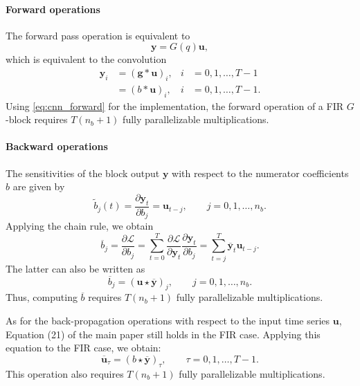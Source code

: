 \documentclass{article}
\newcommand{\q}{q} %
\newcommand{\bb}{b} %
\newcommand{\sens}[1]{\tilde{#1}}
\newcommand{\adjoint}[1]{\overline{#1}}
\newcommand{\conv}{*}
\newcommand{\ccorr}{\star}
\newcommand{\tvec}[1]{\mathbf{#1}}
\newcommand{\nsamp}{T}
\newcommand{\pdiff}[2]{\frac{\partial #1}{\partial #2}}
\newcommand{\loss}{\mathcal{L}}
\begin{document}
\paragraph{Forward operations}
The forward pass operation is equivalent to
\begin{equation}
\tvec{y} = G(\q) \tvec{u},
\end{equation}
which is equivalent to the convolution
\begin{subequations}
\begin{align}
\tvec{y}_i &= (\tvec{g} \conv \tvec{u})_i,  &i&=0,1,\dots,\nsamp-1\\
&= (\bb \conv \tvec{u})_i,  &i&=0,1,\dots,\nsamp-1. \label{eq:cnn_forward}
\end{align}
\end{subequations}
Using \eqref{eq:cnn_forward} for the implementation, the forward operation of a FIR $G$-block requires $\nsamp(n_\bb + 1)$ fully parallelizable multiplications. 

\paragraph{Backward operations}
The sensitivities of the block output $\tvec{y}$ with respect to the numerator coefficients $\bb$ are given by
\begin{equation*}
\sens{b}_j(t) = \pdiff{\tvec{y}_t}{b_j} = \tvec{u}_{t-j}, \qquad j=0,1,\dots,n_\bb.
\end{equation*}
Applying the chain rule, we obtain
\begin{equation*}
\adjoint{b}_j = \pdiff{\loss}{b_j} = 
\sum_{t=0}^{\nsamp} \pdiff{\loss}{\tvec{y}_t} \pdiff{\tvec{y}_t}{b_j}
= \sum_{t=j}^{\nsamp} \adjoint{\tvec{y}}_t \tvec{u}_{t-j}. 
\end{equation*}
The latter can also be written as
\begin{equation*}
\adjoint{\bb}_j =  (\tvec{u} \ccorr \adjoint{\tvec{y}})_j, \qquad j=0,1,\dots,n_\bb.
\end{equation*}
Thus, computing $\adjoint{\bb}$ requires $\nsamp  (n_\bb + 1)$ fully parallelizable multiplications.


As for the back-propagation operations with respect to the input time series ${\tvec{u}}$, Equation (21) of the main paper still holds in the FIR case. 
Applying this equation to the FIR case, we obtain:
\begin{equation*}
\adjoint{\tvec{u}}_\tau = ({\bb} \ccorr \adjoint{\tvec{y}})_{\tau}, \qquad \tau=0,1,\dots,\nsamp-1.
\end{equation*}
This operation also requires  $\nsamp  (n_\bb+1)$ fully parallelizable multiplications.
\end{document}
